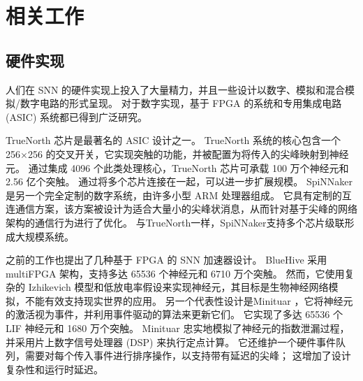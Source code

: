
\chapter{相关工作}

\section{硬件实现}

人们在 SNN 的硬件实现上投入了大量精力，并且一些设计以数字、模拟和混合模拟/数字电路的形式呈现。 
对于数字实现，基于 FPGA 的系统和专用集成电路 (ASIC) 系统都已得到广泛研究。

TrueNorth 芯片是最著名的 ASIC 设计之一。 
TrueNorth 系统的核心包含一个 256$\times$256 的交叉开关，它实现突触的功能，并被配置为将传入的尖峰映射到神经元。 
通过集成 4096 个此类处理核心，TrueNorth 芯片可承载 100 万个神经元和 2.56 亿个突触。 
通过将多个芯片连接在一起，可以进一步扩展规模。 SpiNNaker是另一个完全定制的数字系统，由许多小型 ARM 处理器组成。 
它具有定制的互连通信方案，该方案被设计为适合大量小的尖峰状消息，从而针对基于尖峰的网络架构的通信行为进行了优化。 
与TrueNorth一样，SpiNNaker支持多个芯片级联形成大规模系统。

之前的工作也提出了几种基于 FPGA 的 SNN 加速器设计。 
BlueHive 采用 multiFPGA 架构，支持多达 65536 个神经元和 6710 万个突触。 
然而，它使用复杂的 Izhikevich 模型和低放电率假设来实现神经元，其目标是生物神经网络模拟，不能有效支持现实世界的应用。 
另一个代表性设计是Minituar ，它将神经元的激活视为事件，并利用事件驱动的算法来更新它们。 
它实现了多达 65536 个 LIF 神经元和 1680 万个突触。 
Minituar 忠实地模拟了神经元的指数泄漏过程，并采用片上数字信号处理器 (DSP) 来执行定点计算。 
它还维护一个硬件事件队列，需要对每个传入事件进行排序操作，以支持带有延迟的尖峰； 这增加了设计复杂性和运行时延迟。



